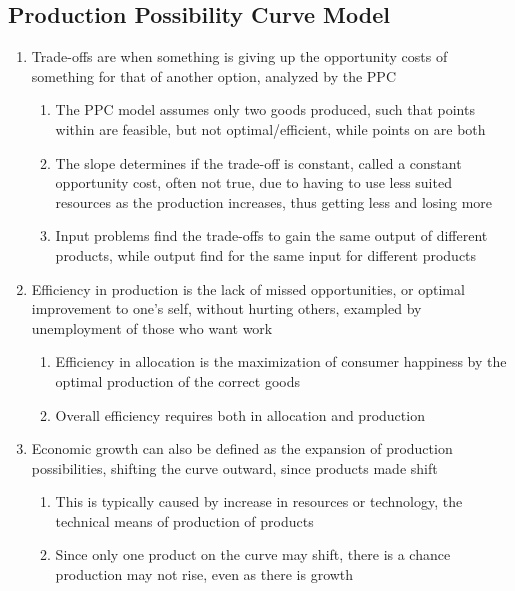 \documentclass[11 pt, twoside]{article}
\begin{document}
\subsection{Production Possibility Curve Model}
\begin{enumerate}
\item Trade{}-offs are when something is giving up the opportunity costs of something for that of another option,
analyzed by the PPC
\begin{enumerate}
\item The PPC model assumes only two goods produced, such that points within are feasible, but not optimal/efficient,
while points on are both
\item The slope determines if the trade{}-off is constant, called a constant opportunity cost, often not true, due to
having to use less suited resources as the production increases, thus getting less and losing more
\item Input problems find the trade{}-offs to gain the same output of different products, while output find for the same
input for different products
\end{enumerate}
\item Efficiency in production is the lack of missed opportunities, or optimal improvement to one{}'s self, without
hurting others, exampled by unemployment of those who want work
\begin{enumerate}
\item Efficiency in allocation is the maximization of consumer happiness by the optimal production of the correct goods
\item Overall efficiency requires both in allocation and production
\end{enumerate}
\item Economic growth can also be defined as the expansion of production possibilities, shifting the curve outward,
since products made shift
\begin{enumerate}
\item This is typically caused by increase in resources or technology, the technical means of production of products
\item Since only one product on the curve may shift, there is a chance production may not rise, even as there is growth
\end{enumerate}
\end{enumerate}
\end{document}

